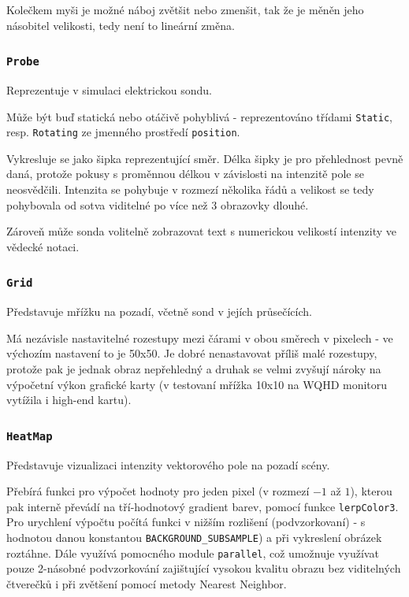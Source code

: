 \documentclass[12pt,a4paper]{article}
\newcommand{\code}[1]{\texttt{#1}}
\begin{document}
Kolečkem myši je možné náboj zvětšit nebo zmenšit, tak že je měněn jeho
násobitel velikosti, tedy není to lineární změna.

\subsubsection{\code{Probe}}

Reprezentuje v simulaci elektrickou sondu.

Může být buď statická nebo otáčivě pohyblivá - reprezentováno třídami
\code{Static}, resp. \code{Rotating} ze jmenného prostředí \code{position}.

Vykresluje se jako šipka reprezentující směr. Délka šipky je pro přehlednost
pevně daná, protože pokusy s proměnnou délkou v závislosti na intenzitě pole se
neosvědčili. Intenzita se pohybuje v rozmezí několika řádů a velikost se tedy
pohybovala od sotva viditelné po více než 3 obrazovky dlouhé.

Zároveň může sonda volitelně zobrazovat text s numerickou velikostí intenzity ve
vědecké notaci.

\subsubsection{\code{Grid}}

Představuje mřížku na pozadí, včetně sond v jejích průsečících.

Má nezávisle nastavitelné rozestupy mezi čárami v obou směrech v pixelech - ve
výchozím nastavení to je 50x50. Je dobré nenastavovat příliš malé rozestupy,
protože pak je jednak obraz nepřehledný a druhak se velmi zvyšují nároky na
výpočetní výkon grafické karty (v testovaní mřížka 10x10 na WQHD monitoru
vytížila i high-end kartu).

\subsubsection{\code{HeatMap}}

Představuje vizualizaci intenzity vektorového pole na pozadí scény.

Přebírá funkci pro výpočet hodnoty pro jeden pixel (v rozmezí $-1$ až $1$), kterou
pak interně převádí na tří-hodnotový gradient barev, pomocí funkce
\code{lerpColor3}. Pro urychlení výpočtu počítá funkci v nižším rozlišení
(podvzorkovaní) - s hodnotou danou konstantou \code{BACKGROUND\_SUBSAMPLE}) a
při vykreslení obrázek roztáhne. Dále využívá pomocného module \code{parallel},
což umožnuje využívat pouze 2-násobné podvzorkování zajištující vysokou kvalitu
obrazu bez viditelných čtverečků i při zvětšení pomocí metody Nearest Neighbor.
\end{document}
